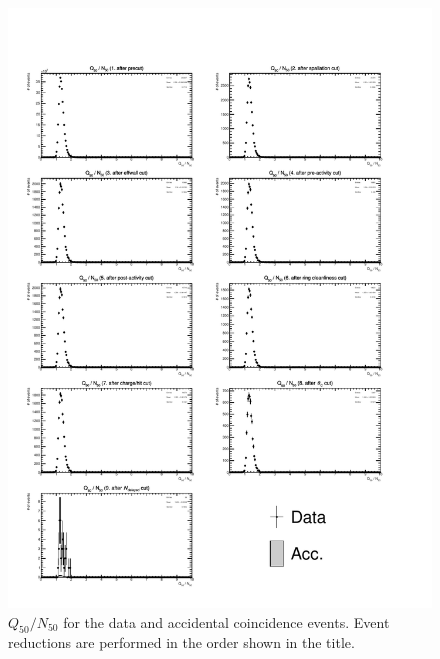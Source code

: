 \begin{figure}[h]
	\centering
	\includegraphics[width=15cm]{PDF/Dist_Data/Che_50deg_tag_ge1/q50n50}
	\caption[$Q_{50}/N_{50}$ for the data and accidental coincidence events]{
	$Q_{50}/N_{50}$ for the data and accidental coincidence events.
	Event reductions are performed in the order shown in the title.
	}\label{Data_q50n50}
\end{figure}

